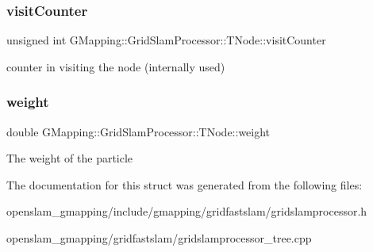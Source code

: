 \subsubsection{\texorpdfstring{visit\+Counter}{visitCounter}}
{\footnotesize\ttfamily unsigned int G\+Mapping\+::\+Grid\+Slam\+Processor\+::\+T\+Node\+::visit\+Counter\hspace{0.3cm}{\ttfamily [mutable]}}

counter in visiting the node (internally used) \mbox{\label{structGMapping_1_1GridSlamProcessor_1_1TNode_ab30d02945ab4cba987bbc428f87b3028}} 
\subsubsection{\texorpdfstring{weight}{weight}}
{\footnotesize\ttfamily double G\+Mapping\+::\+Grid\+Slam\+Processor\+::\+T\+Node\+::weight}

The weight of the particle 

The documentation for this struct was generated from the following files\+:\begin{DoxyCompactItemize}
\item 
openslam\+\_\+gmapping/include/gmapping/gridfastslam/gridslamprocessor.\+h\item 
openslam\+\_\+gmapping/gridfastslam/gridslamprocessor\+\_\+tree.\+cpp\end{DoxyCompactItemize}
